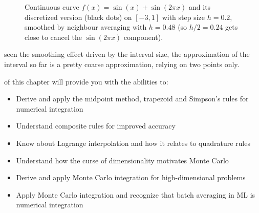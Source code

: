 \begin{figure}[h]
    \centering
    \caption{Continuous curve $f(x)=\sin(x)+\sin(2\pi x)$ and its discretized version (black dots) on $[-3,1]$ with step size $h=0.2$, smoothed by neighbour averaging with $h=0.48$ (so $h/2=0.24$ gets close to cancel the $\sin(2\pi x)$ component).}
    \label{fig:discretizationhighfrequencysmoothedOne}
\end{figure}

 seen the smoothing effect driven by the interval size, the approximation of the interval so far is a pretty coarse approximation, relying on two points only.

\vspace{2.5em}
 of this chapter will provide you with the abilities to:
\begin{itemize}
    \item Derive and apply the midpoint method, trapezoid and Simpson's rules for numerical integration
    \item Understand composite rules for improved accuracy
    \item Know about Lagrange interpolation and how it relates to quadrature rules
    \item Understand how the curse of dimensionality motivates Monte Carlo 
    \item Derive and apply Monte Carlo integration for high-dimensional problems
    \item Apply Monte Carlo integration and recognize that batch averaging in ML is numerical integration
\end{itemize}








